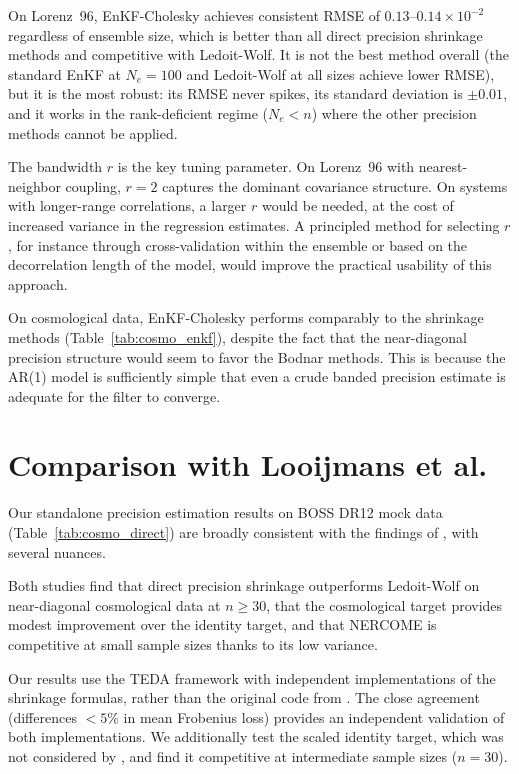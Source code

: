 On Lorenz~96, EnKF-Cholesky achieves consistent RMSE of $0.13$--$0.14 \times 10^{-2}$ regardless of ensemble size, which is better than all direct precision shrinkage methods and competitive with Ledoit-Wolf. It is not the best method overall (the standard EnKF at $N_e = 100$ and Ledoit-Wolf at all sizes achieve lower RMSE), but it is the most robust: its RMSE never spikes, its standard deviation is $\pm 0.01$, and it works in the rank-deficient regime ($N_e < n$) where the other precision methods cannot be applied.

The bandwidth $r$ is the key tuning parameter. On Lorenz~96 with nearest-neighbor coupling, $r = 2$ captures the dominant covariance structure. On systems with longer-range correlations, a larger $r$ would be needed, at the cost of increased variance in the regression estimates. A principled method for selecting $r$, for instance through cross-validation within the ensemble or based on the decorrelation length of the model, would improve the practical usability of this approach.

On cosmological data, EnKF-Cholesky performs comparably to the shrinkage methods (Table~\ref{tab:cosmo_enkf}), despite the fact that the near-diagonal precision structure would seem to favor the Bodnar methods. This is because the AR(1) model is sufficiently simple that even a crude banded precision estimate is adequate for the filter to converge.

\section{Comparison with Looijmans et al.}
\label{sec:disc_looijmans}

Our standalone precision estimation results on BOSS DR12 mock data (Table~\ref{tab:cosmo_direct}) are broadly consistent with the findings of \citep{looijmans2024comparison}, with several nuances.

Both studies find that direct precision shrinkage outperforms Ledoit-Wolf on near-diagonal cosmological data at $n \geq 30$, that the cosmological target provides modest improvement over the identity target, and that NERCOME is competitive at small sample sizes thanks to its low variance.

Our results use the TEDA framework with independent implementations of the shrinkage formulas, rather than the original code from \citep{looijmans2024comparison}. The close agreement (differences $< 5\%$ in mean Frobenius loss) provides an independent validation of both implementations. We additionally test the scaled identity target, which was not considered by \citep{looijmans2024comparison}, and find it competitive at intermediate sample sizes ($n = 30$).

